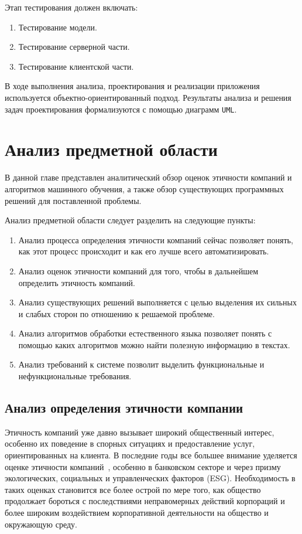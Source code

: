 \documentclass[PI, VKR]{HSEUniversity}
\begin{document}
Этап тестирования должен включать:
\begin{enumerate}
\item Тестирование модели.
\item Тестирование серверной части.
\item Тестирование клиентской части.
\end{enumerate}

В ходе выполнения анализа, проектирования и реализации приложения используется объектно-ориентированный подход. Результаты анализа и решения задач проектирования формализуются с помощью диаграмм \texttt{UML}.
\chapter{Анализ предметной области}
\label{sec:org341a1d1}
В данной главе представлен аналитический обзор оценок этичности компаний и алгоритмов машинного обучения, а также обзор существующих программных решений для поставленной проблемы.

Анализ предметной области следует разделить на следующие пункты:
\begin{enumerate}
\item Анализ процесса определения этичности компаний сейчас позволяет понять, как этот процесс происходит и как его лучше всего автоматизировать.
\item Анализ оценок этичности компаний для того, чтобы в дальнейшем определить этичность компаний.
\item Анализ существующих решений выполняется с целью выделения их сильных и слабых сторон по отношению к решаемой проблеме.
\item Анализ алгоритмов обработки естественного языка позволяет понять с помощью каких алгоритмов можно найти полезную информацию в текстах.
\item Анализ требований к системе позволит выделить функциональные и нефункциональные требования.
\end{enumerate}
\section{Анализ определения этичности компании}
\label{sec:org20f863a}
Этичность компаний уже давно вызывает широкий общественный интерес, особенно их поведение в спорных ситуациях и предоставление услуг, ориентированных на клиента. В последние годы все большее внимание уделяется оценке этичности компаний~\autocites{mure_esg_2021}[][]{semenko_korporativnaya_2022}[][]{kudryavceva_korporativnosocialnaya_2016}, особенно в банковском секторе и через призму экологических, социальных и управленческих факторов (ESG). Необходимость в таких оценках становится все более острой по мере того, как общество продолжает бороться с последствиями неправомерных действий корпораций и более широким воздействием корпоративной деятельности на общество и окружающую среду.
\end{document}
